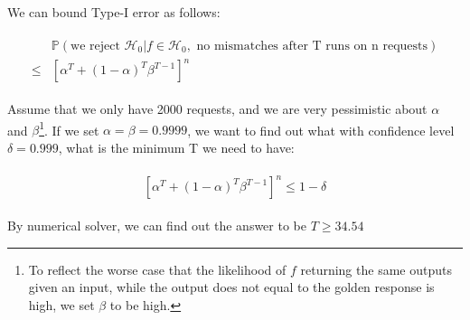 \documentclass[]{article}
\begin{document}
We can bound Type-I error as follows:

\begin{align}
    \begin{split}
    &\mathbb{P}(\text{we reject } \mathcal{H}_0 | f\in\mathcal{H}_0, \text{ no 
        mismatches after T runs on n requests}) 
    \\\leq&\left[\alpha^T + (1-\alpha)^T\beta^{T-1}\right]^n
    \end{split}
\end{align}

Assume that we only have 2000 requests, and we are very pessimistic about 
$\alpha$ and $\beta$\footnote{To reflect the worse case that the 
likelihood of $f$ returning the same outputs given an input, while the output 
does not equal to the golden response is high, we set $\beta$ to be high.}. If 
we set $\alpha=\beta=0.9999$, we want to find out what with confidence level 
$\delta=0.999$, what is the minimum T we need to have:

\begin{align}
    \begin{split}
    \left[\alpha^T + (1-\alpha)^T\beta^{T-1}\right]^n \leq 1 - \delta
    \end{split}
\end{align}

By numerical solver, we can find out the answer to be $T\geq 34.54$
\end{document}
